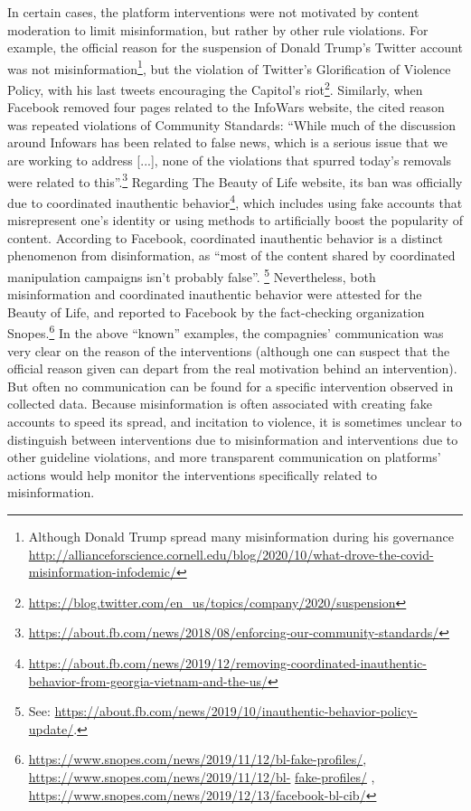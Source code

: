\documentclass{article}
\begin{document}
\smallskip

In certain cases, the platform interventions were not motivated by content moderation to limit misinformation, but rather by other rule violations.
For example, the official reason for the suspension of Donald Trump's Twitter account was not misinformation\footnote{Although Donald Trump spread many misinformation during his governance \url{http://allianceforscience.cornell.edu/blog/2020/10/what-drove-the-covid-misinformation-infodemic/}},
but the violation of Twitter's Glorification of Violence Policy, with his last tweets encouraging the Capitol's riot\footnote{\url{https://blog.twitter.com/en_us/topics/company/2020/suspension}}.
Similarly, when Facebook removed four pages related to the InfoWars website, the cited reason was repeated violations of Community Standards: 
``While much of the discussion around Infowars has been related to false news, which is a serious issue that we are working to address [...], none of the violations that spurred today’s removals were related to this''.\footnote{\url{https://about.fb.com/news/2018/08/enforcing-our-community-standards/}}
Regarding The Beauty of Life website, its ban was officially due to coordinated inauthentic behavior\footnote{\url{https://about.fb.com/news/2019/12/removing-coordinated-inauthentic-behavior-from-georgia-vietnam-and-the-us/}}, 
which includes using fake accounts that misrepresent one's identity or using methods to artificially boost the popularity of content. 
According to Facebook, coordinated inauthentic behavior is a distinct phenomenon from disinformation, as ``most of the content shared by coordinated manipulation campaigns isn’t probably false''.
\footnote{See: \href{https://about.fb.com/news/2019/10/inauthentic-behavior-policy-update/}{https://about.fb.com/news/2019/10/inauthentic-behavior-policy-update/}.} 
Nevertheless, both misinformation and coordinated inauthentic behavior were attested for the Beauty of Life, and reported to Facebook by the fact-checking organization Snopes.\footnote{\href{ https://www.snopes.com/news/2019/11/12/bl-fake-profiles/}{https://www.snopes.com/news/2019/11/12/bl-fake-profiles/}, 
\href{https://www.snopes.com/news/2019/11/12/bl-fake-profiles/}{https://www.snopes.com/news/2019/11/12/bl-} \href{https://www.snopes.com/news/2019/11/12/bl-fake-profiles/}{fake-profiles/} , 
\href{https://www.snopes.com/news/2019/12/13/facebook-bl-cib/}{https://www.snopes.com/news/2019/12/13/facebook-bl-cib/}} 
In the above ``known'' examples, the compagnies' communication was very clear on the reason of the interventions (although one can suspect that the official reason given can depart from the real motivation behind an intervention). 
But often no communication can be found for a specific intervention observed in collected data. 
Because misinformation is often associated with creating fake accounts to speed its spread, and incitation to violence, it is sometimes unclear to distinguish between interventions due to misinformation and interventions due to other guideline violations, and more transparent communication on platforms' actions would help monitor the interventions specifically related to misinformation.
\end{document}
